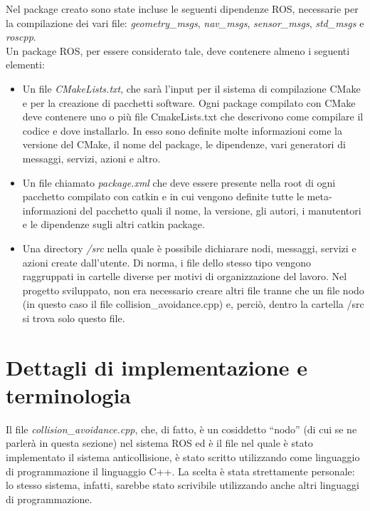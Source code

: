 Nel package creato sono state incluse le seguenti dipendenze ROS, necessarie per la compilazione dei vari file: \textit{geometry\_msgs}, \textit{nav\_msgs}, \textit{sensor\_msgs}, \textit{std\_msgs} e \textit{roscpp}. \\
Un package ROS, per essere considerato tale, deve contenere almeno i seguenti elementi:
\begin{itemize}
	\item Un file \textit{CMakeLists.txt}, che sarà l’input per il sistema di compilazione CMake e per la creazione di pacchetti software. Ogni package compilato con CMake deve contenere uno o più file CmakeLists.txt che descrivono come compilare il codice e dove installarlo. In esso sono definite molte informazioni come la versione del CMake, il nome del package, le dipendenze, vari generatori di messaggi, servizi, azioni e altro.
	\item Un file chiamato \textit{package.xml} che deve essere presente nella root di ogni pacchetto compilato con catkin e in cui vengono definite tutte le meta-informazioni del pacchetto quali il nome, la versione, gli autori, i manutentori e le dipendenze sugli altri catkin package.
	\item Una directory \textit{/src} nella quale è possibile dichiarare nodi, messaggi, servizi e azioni create dall’utente. Di norma, i file dello stesso tipo vengono raggruppati in cartelle diverse per motivi di organizzazione del lavoro. Nel progetto sviluppato, non era necessario creare altri file tranne che un file nodo (in questo caso il file collision\_avoidance.cpp) e, perciò, dentro la cartella /src si trova solo questo file.
\end{itemize}

\section{Dettagli di implementazione e terminologia}

Il file \textit{collision\_avoidance.cpp}, che, di fatto, è un cosiddetto ``nodo'' (di cui se ne parlerà in questa sezione) nel sistema ROS ed è il file nel quale è stato implementato il sistema anticollisione, è stato scritto utilizzando come linguaggio di programmazione il linguaggio C++. La scelta è stata strettamente personale: lo stesso sistema, infatti, sarebbe stato scrivibile utilizzando anche altri linguaggi di programmazione. \\

